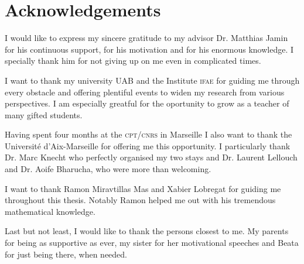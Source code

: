 \documentclass[../../index.tex]{subfiles}
\begin{document}
\chapter*{Acknowledgements}
I would like to express my sincere gratitude to my advisor Dr. Matthias Jamin
for his continuous support, for his motivation and for his enormous knowledge. I
specially thank him for not giving up on me even in complicated times.

I want to thank my university \textsc{UAB} and the Institute \textsc{ifae} for
guiding me through every obstacle and offering plentiful events to widen my
research from various perspectives. I am especially greatful for the oportunity
to grow as a teacher of many gifted students.

Having spent four months at the \textsc{cpt}/\textsc{cnrs} in Marseille I also
want to thank the Université d'Aix-Marseille for offering me this opportunity. I
particularly thank Dr. Marc Knecht who perfectly organised my two stays and Dr.
Laurent Lellouch and Dr. Aoife Bharucha, who were more than welcoming.

I want to thank Ramon Miravtillas Mas and Xabier Lobregat for guiding me
throughout this thesis. Notably Ramon helped me out with his tremendous
mathematical knowledge.

Last but not least, I would like to thank the persons closest to me. My parents
for being as supportive as ever, my sister for her motivational speeches and
Beata for just being there, when needed.
\end{document}
